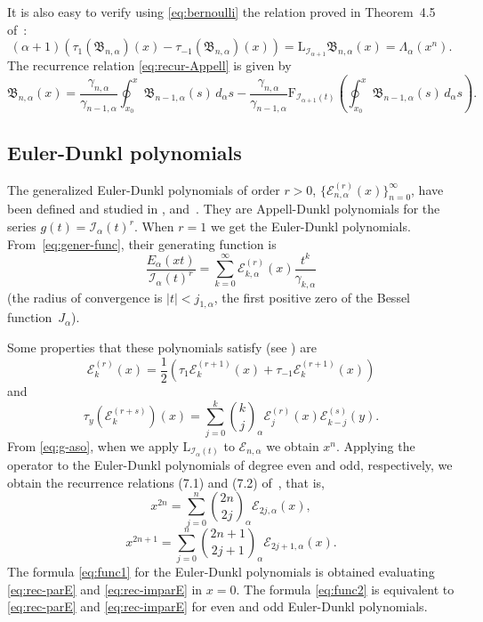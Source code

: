 \documentclass[11pt]{article}
\theoremstyle{plain}
\theoremstyle{remark}
\newtheorem{example}[theorem]{Example}
\numberwithin{equation}{section} %
\newcommand{\Ea}{E_{\alpha}}
\newcommand{\La}{\Lambda_{\alpha}}
\newcommand{\binoma}[2]{\binom{#1}{#2}_{\!\alpha}}
\newcommand{\I}{\mathcal{I}}
\newcommand{\B}{\mathfrak{B}}
\newcommand{\E}{\mathcal{E}}
\newcommand{\FF}{\mathrm{F}}
\newcommand{\LL}{\mathrm{L}}
\begin{document}
It is also easy to verify using \eqref{eq:bernoulli} the relation proved in Theorem~4.5 of~\cite{CMV}:
\[
(\alpha+1)(\tau_1(\B_{n,\alpha})(x)-\tau_{-1}(\B_{n,\alpha})(x)) 
= \LL_{\I_{\alpha+1}}\B_{n,\alpha}(x) = \La(x^n).
\]
The recurrence relation \eqref{eq:recur-Appell} is given by
\[
\B_{n,\alpha}(x) = \frac{\gamma_{n,\alpha}}{\gamma_{n-1,\alpha}}
\oint_{x_0}^x \B_{n-1,\alpha}(s)\,d_{\alpha}s - \frac{\gamma_{n,\alpha}}{\gamma_{n-1,\alpha}}
\FF_{\I_{\alpha+1}(t)} \left(\oint_{x_0}^x\B_{n-1,\alpha}(s)\,d_{\alpha}s\right).
\]

\subsection{Euler-Dunkl polynomials}

The generalized Euler-Dunkl polynomials of order $r>0$, $\{\E_{n,\alpha}^{(r)}(x)\}_{n=0}^\infty$, have been defined and studied in \cite{DPV}, \cite{CMV} and~\cite{MV}. They are Appell-Dunkl polynomials for the series $g(t) = \I_{\alpha}(t)^r$. When $r=1$ we get the Euler-Dunkl polynomials.
From~\eqref{eq:gener-func}, their generating function is
\[
\frac{\Ea(xt)}{\I_{\alpha}(t)^r} 
= \sum_{k=0}^{\infty} {\E_{k,\alpha}^{(r)}(x)} \frac{t^k}{\gamma_{k,\alpha}}
\]
(the radius of convergence is $|t| < j_{1,\alpha}$, the first positive zero of the Bessel function~$J_{\alpha}$).

Some properties that these polynomials satisfy (see \cite{CMV}) are
\[
\E_k^{(r)}(x) = \frac{1}{2}(\tau_1\E_k^{(r+1)}(x) + \tau_{-1}\E_k^{(r+1)}(x))
\]
and
\[
\tau_y(\E_k^{(r+s)})(x) = \sum_{j=0}^{k}\binoma{k}{j} \E_j^{(r)}(x)\E_{k-j}^{(s)}(y).
\]
From \eqref{eq:g-aso}, when we apply $\LL_{\I_{\alpha}(t)}$ to $\E_{n,\alpha}$ we obtain $x^n$. Applying the operator to the Euler-Dunkl polynomials of degree even and odd, respectively, we obtain the recurrence relations (7.1) and (7.2) of~\cite{CMV}, that is,
\begin{equation}
\label{eq:rec-parE}
x^{2n} = \sum_{j=0}^n \binoma{2n}{2j}\E_{2j,\alpha}(x),
\end{equation}
\begin{equation}
\label{eq:rec-imparE}
x^{2n+1} = \sum_{j=0}^n \binoma{2n+1}{2j+1} \E_{2j+1,\alpha}(x).
\end{equation}
The formula \eqref{eq:func1} for the Euler-Dunkl polynomials is obtained evaluating \eqref{eq:rec-parE} and \eqref{eq:rec-imparE} in $x = 0$. The formula \eqref{eq:func2} is equivalent to \eqref{eq:rec-parE} and \eqref{eq:rec-imparE} for even and odd Euler-Dunkl polynomials.
\end{document}
